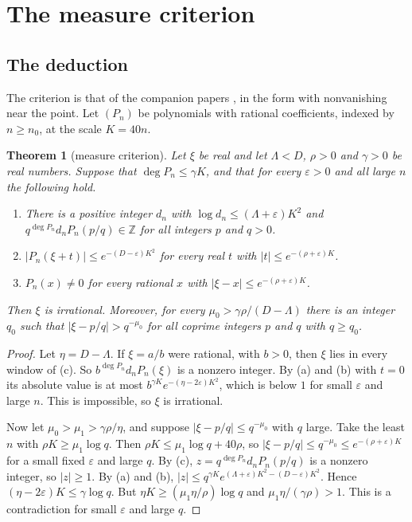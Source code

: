 \documentclass[11pt]{amsart}
\newtheorem{theorem}{Theorem}[section]
\theoremstyle{definition}
\theoremstyle{remark}
\numberwithin{equation}{section}
\newcommand{\Z}{\mathbb Z}
\begin{document}
\section{The measure criterion}\label{sec:criterion}

\subsection{The deduction}
The criterion is that of the companion papers \cite{Litsey2026,Litsey2026b}, in the form with nonvanishing near the
point. Let $(P_n)$ be polynomials with rational coefficients, indexed by $n\ge n_0$, at the scale $K=40n$.

\begin{theorem}[measure criterion]\label{thm:criterion}
Let $\xi$ be real and let $\Lambda<D$, $\rho>0$ and $\gamma>0$ be real numbers. Suppose that $\deg P_n\le\gamma K$, and
that for every $\varepsilon>0$ and all large $n$ the following hold.
\begin{enumerate}[label=(\alph*)]
\item There is a positive integer $d_n$ with $\log d_n\le(\Lambda+\varepsilon)K^2$ and $q^{\deg P_n}d_nP_n(p/q)\in\Z$
 for all integers $p$ and $q>0$.
\item $|P_n(\xi+t)|\le e^{-(D-\varepsilon)K^2}$ for every real $t$ with $|t|\le e^{-(\rho+\varepsilon)K}$.
\item $P_n(x)\ne0$ for every rational $x$ with $|\xi-x|\le e^{-(\rho+\varepsilon)K}$.
\end{enumerate}
Then $\xi$ is irrational. Moreover, for every $\mu_0>\gamma\rho/(D-\Lambda)$ there is an integer $q_0$ such that
$|\xi-p/q|>q^{-\mu_0}$ for all coprime integers $p$ and $q$ with $q\ge q_0$.
\end{theorem}

\begin{proof}
Let $\eta=D-\Lambda$. If $\xi=a/b$ were rational, with $b>0$, then $\xi$ lies in every window of (c). So
$b^{\deg P_n}d_nP_n(\xi)$ is a nonzero integer. By (a) and (b) with $t=0$ its absolute value is at most
$b^{\gamma K}e^{-(\eta-2\varepsilon)K^2}$, which is below $1$ for small $\varepsilon$ and large $n$. This is
impossible, so $\xi$ is irrational.

Now let $\mu_0>\mu_1>\gamma\rho/\eta$, and suppose $|\xi-p/q|\le q^{-\mu_0}$ with $q$ large. Take the least $n$ with
$\rho K\ge\mu_1\log q$. Then $\rho K\le\mu_1\log q+40\rho$, so $|\xi-p/q|\le q^{-\mu_0}\le e^{-(\rho+\varepsilon)K}$
for a small fixed $\varepsilon$ and large $q$. By (c), $z=q^{\deg P_n}d_nP_n(p/q)$ is a nonzero integer, so $|z|\ge1$.
By (a) and (b), $|z|\le q^{\gamma K}e^{(\Lambda+\varepsilon)K^2-(D-\varepsilon)K^2}$. Hence
$(\eta-2\varepsilon)K\le\gamma\log q$. But $\eta K\ge(\mu_1\eta/\rho)\log q$ and $\mu_1\eta/(\gamma\rho)>1$. This is a
contradiction for small $\varepsilon$ and large $q$.
\end{proof}
\end{document}
